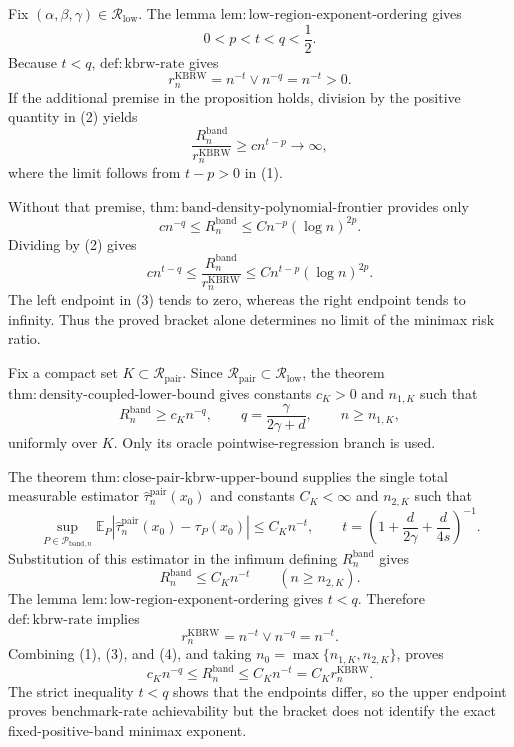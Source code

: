 Fix \((\alpha,\beta,\gamma)\in\mathcal R_{\mathrm{low}}\).  The lemma
\(\mathrm{lem:low\mbox{-}region\mbox{-}exponent\mbox{-}ordering}\) gives
\[
0<p<t<q<\frac12.
\tag{1}
\]
Because \(t<q\), \(\mathrm{def:kbrw\mbox{-}rate}\) gives
\[
r_n^{\mathrm{KBRW}}=n^{-t}\vee n^{-q}=n^{-t}>0.
\tag{2}
\]
If the additional premise in the proposition holds, division by the positive
quantity in (2) yields
\[
\frac{R_n^{\mathrm{band}}}{r_n^{\mathrm{KBRW}}}
\geq c n^{t-p}\longrightarrow\infty,
\]
where the limit follows from \(t-p>0\) in (1).

Without that premise,
\(\mathrm{thm:band\mbox{-}density\mbox{-}polynomial\mbox{-}frontier}\)
provides only
\[
c n^{-q}\leq R_n^{\mathrm{band}}
\leq Cn^{-p}(\log n)^{2p}.
\]
Dividing by (2) gives
\[
c n^{t-q}\leq
\frac{R_n^{\mathrm{band}}}{r_n^{\mathrm{KBRW}}}
\leq Cn^{t-p}(\log n)^{2p}.
\tag{3}
\]
The left endpoint in (3) tends to zero, whereas the right endpoint tends to
infinity.  Thus the proved bracket alone determines no limit of the minimax
risk ratio.

Fix a compact set \(K\subset\mathcal R_{\mathrm{pair}}\).  Since
\(\mathcal R_{\mathrm{pair}}\subset\mathcal R_{\mathrm{low}}\), the theorem
\(\mathrm{thm:density\mbox{-}coupled\mbox{-}lower\mbox{-}bound}\) gives
constants \(c_K>0\) and \(n_{1,K}\) such that
\[
R_n^{\mathrm{band}}\geq c_Kn^{-q},
\qquad
q=\frac{\gamma}{2\gamma+d},
\qquad n\geq n_{1,K},
\tag{1}
\]
uniformly over \(K\).  Only its oracle pointwise-regression branch is used.

The theorem
\(\mathrm{thm:close\mbox{-}pair\mbox{-}kbrw\mbox{-}upper\mbox{-}bound}\)
supplies the single total measurable estimator
\(\widehat\tau_n^{\mathrm{pair}}(x_0)\) and constants \(C_K<\infty\) and
\(n_{2,K}\) such that
\[
\sup_{P\in\mathcal P_{\mathrm{band},n}}
\mathbb E_P\left|
\widehat\tau_n^{\mathrm{pair}}(x_0)-\tau_P(x_0)
\right|
\leq C_Kn^{-t},
\qquad
t=\left(1+\frac d{2\gamma}+\frac d{4s}\right)^{-1}.
\tag{2}
\]
Substitution of this estimator in the infimum defining
\(R_n^{\mathrm{band}}\) gives
\[
R_n^{\mathrm{band}}\leq C_Kn^{-t}
\qquad(n\geq n_{2,K}).
\tag{3}
\]
The lemma
\(\mathrm{lem:low\mbox{-}region\mbox{-}exponent\mbox{-}ordering}\) gives
\(t<q\).  Therefore \(\mathrm{def:kbrw\mbox{-}rate}\) implies
\[
r_n^{\mathrm{KBRW}}=n^{-t}\vee n^{-q}=n^{-t}.
\tag{4}
\]
Combining (1), (3), and (4), and taking
\(n_0=\max\{n_{1,K},n_{2,K}\}\), proves
\[
c_Kn^{-q}\leq R_n^{\mathrm{band}}
\leq C_Kn^{-t}=C_Kr_n^{\mathrm{KBRW}}.
\]
The strict inequality \(t<q\) shows that the endpoints differ, so the upper
endpoint proves benchmark-rate achievability but the bracket does not identify
the exact fixed-positive-band minimax exponent.

